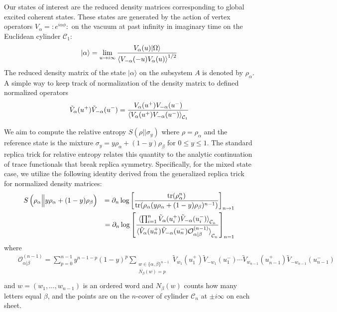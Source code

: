 \documentclass[11pt]{article}
\newcommand{\mO}{\mathcal{O}}
\newcommand{\nn}{\nonumber}
\begin{document}
  Our states of interest are the reduced density matrices corresponding to
  global excited coherent states. These states are generated by the action of vertex
  operators $V_{\alpha}=:e^{i\alpha \phi}:$ on the vacuum at past infinity in imaginary
  time on the Euclidean cylinder $\mathcal{C}_{1}$:
  \begin{equation}
    |\alpha\rangle = \lim_{u\to i\infty}\frac{V_{\alpha}(u)|\Omega\rangle}{\braket{V_{-\alpha}(-u)V_\alpha(u)}^{1/2}}
  \end{equation}
  The reduced density matrix of the state $|\alpha\rangle$ on the subsystem $A$
  is denoted by $\rho_{\alpha}$. A simple way to keep track of normalization of the
  density matrix to defined normalized operators
  \begin{eqnarray}
    \tilde{V}_{\alpha}(u^+)\tilde{V}_{-\alpha}(u^-)=\frac{V_{\alpha}(u^{+})V_{-\alpha}(u^{-})}{\braket{V_{\alpha}(u^+)V_{-\alpha}(u^-)}_{\mathcal{C}_1}}
  \end{eqnarray}

  We aim to compute the relative entropy $S(\rho || \sigma_{y})$ where
  $\rho = \rho_{\alpha}$ and the reference state is the mixture
  $\sigma_{y}= y\rho_{\alpha}+(1-y) \rho_{\beta}$ for $0\leq y\leq 1$. The standard
  replica trick for relative entropy relates this quantity to the analytic continuation
  of trace functionals that break replica symmetry. Specifically, for the mixed state
  case, we utilize the following identity derived from the generalized replica
  trick for normalized density matrices:
  \begin{eqnarray}
    S\left(\rho_\alpha \Big\| y\rho_\alpha+(1-y)\rho_\beta\right)&&= \partial_{n}
    \log \left[ \frac{\text{tr}(\rho_{\alpha}^{n})}{\text{tr}(\rho_{\alpha}(y\rho_{\alpha}+(1-y)\rho_{\beta})^{n-1})}
    \right]_{n\to 1}\nn\\
    && =\partial_n\log\left[
    \frac{\braket{\prod_{i=1}^{n} \tilde{V}_{\alpha}(u^+_i)\tilde{V}_{-\alpha}(u^-_i)}_{\mathcal{C}_n}}{\braket{\tilde{V}_\alpha(u^+_n)\tilde{V}_{-\alpha}(u^-_n)\mO^{(n-1)}_{\alpha|\beta}}_{\mathcal{C}_n}}\right]_{n=1}
  \end{eqnarray}
  where
  \begin{eqnarray}
    &&\mO_{\alpha|\beta}^{(n-1)}=\sum_{p=0}^{n-1}y^{n-1-p}(1-y)^p\sum_{\substack{w\in\{\alpha,\beta\}^{n-1}\\ N_\beta(w)=p}}
    \tilde{V}_{w_1}(u_1^+)\tilde{V}_{-w_1}(u_1^-)\cdots \tilde{V}_{w_{n-1}}(u_{n-1}^+)\tilde{V}_{-w_{n-1}}(u_{n-1}^-)\nn\\
  \end{eqnarray}
  and $w=(w_{1},\dots,w_{n-1})$ is an ordered word and $N_{\beta}(w)$ counts how
  many letters equal $\beta$, and the points are on the $n$-cover of cylinder
  $\mathcal{C}_{n}$ at $\pm i\infty$ on each sheet.
\end{document}

